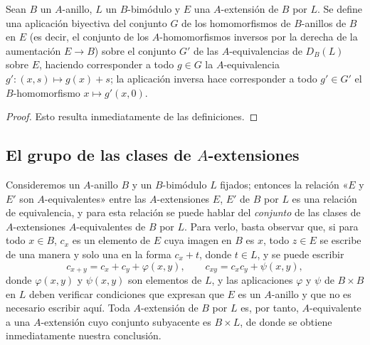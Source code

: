 \begin{proposition}[18.2.10]
\label{0.18.2.10-es}
Sean $B$ un $A$-anillo, $L$ un $B$-bimódulo y $E$ una $A$-extensión de $B$
por $L$. Se define una aplicación biyectiva del conjunto $G$ de los
homomorfismos de $B$-anillos de $B$ en $E$ \textup{(es decir, el conjunto de los
$A$-homomorfismos inversos por la derecha de la aumentación $E\to B$)} sobre el
conjunto $G'$ de las $A$-equivalencias de $D_B(L)$ sobre $E$, haciendo
corresponder a todo $g\in G$ la $A$-equivalencia
$g':(x,s)\mapsto g(x)+s$; la aplicación inversa hace corresponder a todo
$g'\in G'$ el $B$-homomorfismo $x\mapsto g'(x,0)$.
\end{proposition}

\begin{proof}
Esto resulta inmediatamente de las definiciones.
\end{proof}

\subsection{El grupo de las clases de $A$-extensiones}
\label{subsection:0.18.3-es}

\begin{env}[18.3.1]
\label{0.18.3.1-es}
Consideremos un $A$-anillo $B$ y un $B$-bimódulo $L$ fijados; entonces la
relación «$E$ y $E'$ son $A$-equivalentes» entre las $A$-extensiones $E$, $E'$
de $B$ por $L$ es una relación de equivalencia, y para esta relación se puede
hablar del \emph{conjunto} de las clases de $A$-extensiones $A$-equivalentes de
$B$ por $L$. Para verlo, basta observar que, si para todo $x\in B$, $c_x$ es
un elemento de $E$ cuya imagen en $B$ es $x$, todo $z\in E$ se escribe de una
manera y solo una en la forma $c_x+t$, donde $t\in L$, y se puede escribir
\[
  c_{x+y}=c_x+c_y+\varphi(x,y),\qquad
  c_{xy}=c_xc_y+\psi(x,y),
\]
donde $\varphi(x,y)$ y $\psi(x,y)$ son elementos de $L$, y las aplicaciones
$\varphi$ y $\psi$ de $B\times B$ en $L$ deben verificar condiciones que
expresan que $E$ es un $A$-anillo y que no es necesario escribir aquí. Toda
$A$-extensión de $B$ por $L$ es, por tanto, $A$-equivalente a una
$A$-extensión cuyo conjunto subyacente es $B\times L$, de donde se obtiene
inmediatamente nuestra conclusión.
\end{env}

